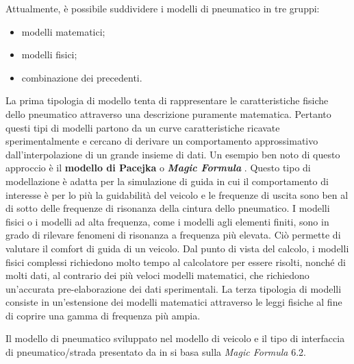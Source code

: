 Attualmente, è possibile suddividere i modelli di pneumatico in tre gruppi:
\begin{itemize}
	\item modelli matematici;
	\item modelli fisici;
	\item combinazione dei precedenti.
\end{itemize}

\noindent
La prima tipologia di modello tenta di rappresentare le caratteristiche fisiche dello pneumatico attraverso una descrizione puramente matematica. Pertanto questi tipi di modelli partono da un curve caratteristiche ricavate sperimentalmente e cercano di derivare un comportamento approssimativo dall'interpolazione di un grande insieme di dati. Un esempio ben noto di questo approccio è il \textbf{modello di Pacejka} o \textbf{\textit{Magic Formula}} \cite{hans}. Questo tipo di modellazione è adatta per la simulazione di guida in cui il comportamento di interesse è per lo più la guidabilità del veicolo e le frequenze di uscita sono ben al di sotto delle frequenze di risonanza della cintura dello pneumatico. I modelli fisici o i modelli ad alta frequenza, come i modelli agli elementi finiti, sono in grado di rilevare fenomeni di risonanza a frequenza più elevata. Ciò permette di valutare il comfort di guida di un veicolo. Dal punto di vista del calcolo, i modelli fisici complessi richiedono molto tempo al calcolatore per essere risolti, nonché di molti dati, al contrario dei più veloci modelli matematici, che richiedono un'accurata pre-elaborazione dei dati sperimentali. La terza tipologia di modelli consiste in un'estensione dei modelli matematici attraverso le leggi fisiche al fine di coprire una gamma di frequenza più ampia.

Il modello di pneumatico sviluppato nel modello di veicolo e il tipo di interfaccia di pneumatico/strada presentato da \citeauthor{Larcher} in \cite{Larcher} si basa sulla \textit{Magic Formula} 6.2.
%
